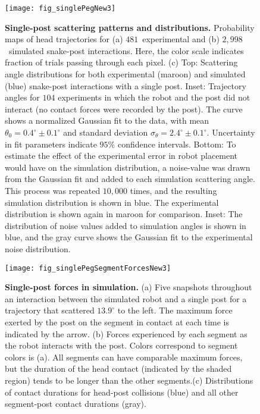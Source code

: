 \documentclass[aps,pre,twocolumn,superscriptaddress]{revtex4-1}
\begin{document}
\begin{figure}[ht!]
	\texttt{[image: fig\_singlePegNew3]}
	\caption{\textbf{Single-post scattering patterns and distributions.} Probability maps of head trajectories for (a) $481$~experimental and (b) $2,998$~simulated snake-post interactions. Here, the color scale indicates fraction of trials passing through each pixel. (c) Top: Scattering angle distributions for both experimental (maroon) and simulated (blue) snake-post interactions with a single post. Inset: Trajectory angles for $104$ experiments in which the robot and the post did not interact (no contact forces were recorded by the post). The curve shows a normalized Gaussian fit to the data, with mean $\theta_0 = 0.4^\circ \pm 0.1^\circ$ and standard deviation $\sigma_\theta = 2.4^\circ \pm 0.1^\circ$. Uncertainty in fit parameters indicate $95\%$ confidence intervals. Bottom: To estimate the effect of the experimental error in robot placement would have on the simulation distribution, a noise-value was drawn from the Gaussian fit and added to each simulation scattering angle. This process was repeated $10,000$ times, and the resulting simulation distribution is shown in blue. The experimental distribution is shown again in maroon for comparison. Inset: The distribution of noise values added to simulation angles is shown in blue, and the gray curve shows the Gaussian fit to the experimental noise distribution.}
	\label{fig:singlepegheatmaps}
\end{figure}


\begin{figure}[ht!]
	\texttt{[image: fig\_singlePegSegmentForcesNew3]}
	\caption{\textbf{Single-post forces in simulation.} (a) Five snapshots throughout an interaction between the simulated robot and a single post for a trajectory that scattered $13.9^\circ$ to the left. The maximum force exerted by the post on the segment in contact at each time is indicated by the arrow. (b) Forces experienced by each segment as the robot interacts with the post. Colors correspond to segment colors is (a). All segments can have comparable maximum forces, but the duration of the head contact (indicated by the shaded region) tends to be longer than the other segments.(c) Distributions of contact durations for head-post collisions (blue) and all other segment-post contact durations (gray). }
	\label{fig:singlepegforces}
\end{figure}
\end{document}
